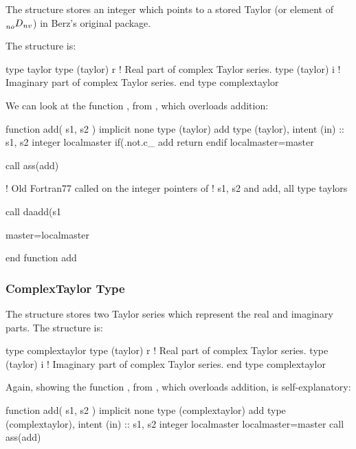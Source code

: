\documentclass{hitec}     %
\begin{document}
{{The  structure stores  an integer  which points to a stored Taylor (or element of $\prescript{}{no}{D}_{nv}$) in Berz's original package.

The structure is:
\begin{code}
type taylor
   type (taylor) r     ! Real part of complex Taylor series.
   type (taylor) i     ! Imaginary part of complex Taylor series.
end type complextaylor
\end{code}

We can look at the function , from , which overloads addition:

\begin{code}
  function add( s1, s2 )
    implicit none
    type (taylor) add
    type (taylor), intent (in) :: s1, s2
    integer localmaster
    if(.not.c_%
       add%
      return
    endif
    localmaster=master

    call ass(add)
    
 ! Old Fortran77 called on the integer pointers of 
 ! s1, s2 and add, all type taylors
 
    call daadd(s1%

    master=localmaster

  end function add
  \end{code}
  
\subsubsection{ComplexTaylor Type}
\label{s:ctaylor}

The  structure stores two Taylor series which represent the real and imaginary parts.
The structure is:
\begin{code}
type complextaylor
   type (taylor) r     ! Real part of complex Taylor series.
   type (taylor) i     ! Imaginary part of complex Taylor series.
end type complextaylor
\end{code}

Again, showing the function , from , which overloads addition, is self-explanatory:

\begin{code}
  function add( s1, s2 )
    implicit none
    type (complextaylor) add
    type (complextaylor), intent (in) :: s1, s2
    integer localmaster
    localmaster=master
    call ass(add)
    

\end{code}}}
\end{document}
